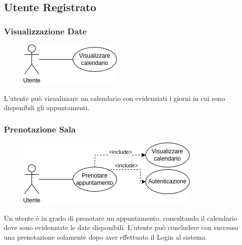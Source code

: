 \documentclass{article}
\begin{document}
\subsection{Utente Registrato}

\subsubsection{Visualizzazione Date}\label{rf_1}
\begin{description}
	    
	\begin{figure}[htp]
		\centering
		\includegraphics[]{rf1.png}
	\end{figure}
	    
	\item L'utente può visualizzare un calendario con evidenziati i giorni in cui sono disponibili gli appuntamenti. 
\end{description}

\subsubsection{Prenotazione Sala}\label{rf_2}
\begin{description}
	
	\begin{figure}[htp]
		\centering
		\includegraphics[]{rf2.png}
	\end{figure}
		
	\item Un utente è in grado di prenotare un appuntamento, consultando il calendario dove sono evidenziate le date disponibili. L'utente può concludere con successo una prenotazione solamente dopo aver effettuato il Login al sistema.   	
\end{description}

\clearpage
\end{document}
